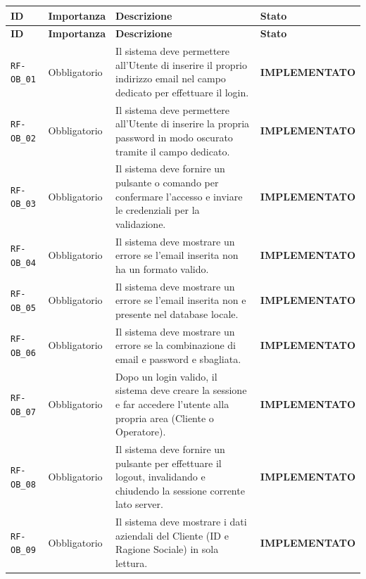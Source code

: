 \documentclass[a4paper, 11pt, oneside]{scrartcl}
\begin{document}
\renewcommand{\arraystretch}{1.15}
\begin{longtable}{|>{\raggedright\arraybackslash}p{}|>{\raggedright\arraybackslash}p{}|>{\raggedright\arraybackslash}p{}|>{\raggedright\arraybackslash}p{}|}
    \hline
    \rowcolor[gray]{0.9}
    \textbf{ID} & \textbf{Importanza} & \textbf{Descrizione} & \textbf{Stato} \\
    \hline
    \endfirsthead
    \hline
    \rowcolor[gray]{0.9}
    \textbf{ID} & \textbf{Importanza} & \textbf{Descrizione} & \textbf{Stato} \\
    \hline
    \endhead
    \texttt{RF-OB\_01} & Obbligatorio & Il sistema deve permettere all'Utente di inserire il proprio indirizzo email nel campo dedicato per effettuare il login. & \textbf{IMPLEMENTATO} \\
    \hline
    \texttt{RF-OB\_02} & Obbligatorio & Il sistema deve permettere all'Utente di inserire la propria password in modo oscurato tramite il campo dedicato. & \textbf{IMPLEMENTATO} \\
    \hline
    \texttt{RF-OB\_03} & Obbligatorio & Il sistema deve fornire un pulsante o comando per confermare l'accesso e inviare le credenziali per la validazione. & \textbf{IMPLEMENTATO} \\
    \hline
    \texttt{RF-OB\_04} & Obbligatorio & Il sistema deve mostrare un errore se l'email inserita non ha un formato valido. & \textbf{IMPLEMENTATO} \\
    \hline
    \texttt{RF-OB\_05} & Obbligatorio & Il sistema deve mostrare un errore se l'email inserita non e presente nel database locale. & \textbf{IMPLEMENTATO} \\
    \hline
    \texttt{RF-OB\_06} & Obbligatorio & Il sistema deve mostrare un errore se la combinazione di email e password e sbagliata. & \textbf{IMPLEMENTATO} \\
    \hline
    \texttt{RF-OB\_07} & Obbligatorio & Dopo un login valido, il sistema deve creare la sessione e far accedere l'utente alla propria area (Cliente o Operatore). & \textbf{IMPLEMENTATO} \\
    \hline
    \texttt{RF-OB\_08} & Obbligatorio & Il sistema deve fornire un pulsante per effettuare il logout, invalidando e chiudendo la sessione corrente lato server. & \textbf{IMPLEMENTATO} \\
    \hline
    \texttt{RF-OB\_09} & Obbligatorio & Il sistema deve mostrare i dati aziendali del Cliente (ID e Ragione Sociale) in sola lettura. & \textbf{IMPLEMENTATO} \\

\end{longtable}
\end{document}
